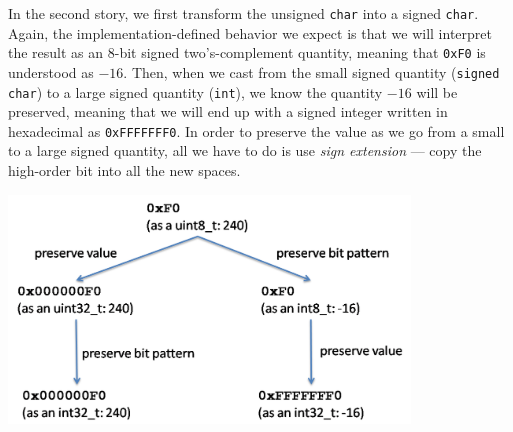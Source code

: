 In the second story, we first transform the unsigned \lstinline'char'
into a signed \lstinline'char'. Again, the implementation-defined
behavior we expect is that we will interpret the result as an 8-bit
signed two's-complement quantity, meaning that \lstinline'0xF0' is
understood as $-16$.  Then, when we cast from the small signed
quantity (\lstinline'signed char') to a large signed quantity
(\lstinline'int'), we know the quantity $-16$ will be preserved,
meaning that we will end up with a signed integer written in
hexadecimal as \lstinline'0xFFFFFFF0'. In order to preserve the value
as we go from a small to a large signed quantity, all we have to do is
use \emph{sign extension} --- copy the high-order bit into all the new
spaces.
\begin{center}
\includegraphics[width=0.8\textwidth]{img/cast.png}
\end{center}


